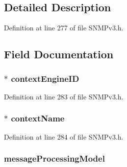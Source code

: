 \subsection{Detailed Description}


Definition at line 277 of file S\+N\+M\+Pv3.\+h.



\subsection{Field Documentation}
\hypertarget{structprocess_response_pdu_aa75baf2d001f5d5ac415eed279fd6e85}{}
\subsubsection[{context\+Engine\+I\+D}]{$\ast$ context\+Engine\+I\+D}\label{structprocess_response_pdu_aa75baf2d001f5d5ac415eed279fd6e85}


Definition at line 283 of file S\+N\+M\+Pv3.\+h.

\hypertarget{structprocess_response_pdu_af55ce5882ccbc8435fb33f1020c74550}{}
\subsubsection[{context\+Name}]{$\ast$ context\+Name}\label{structprocess_response_pdu_af55ce5882ccbc8435fb33f1020c74550}


Definition at line 284 of file S\+N\+M\+Pv3.\+h.

\hypertarget{structprocess_response_pdu_a47f1a1b8f7a3fe5623fe37df094ac032}{}
\subsubsection[{message\+Processing\+Model}]{ message\+Processing\+Model}\label{structprocess_response_pdu_a47f1a1b8f7a3fe5623fe37df094ac032}


